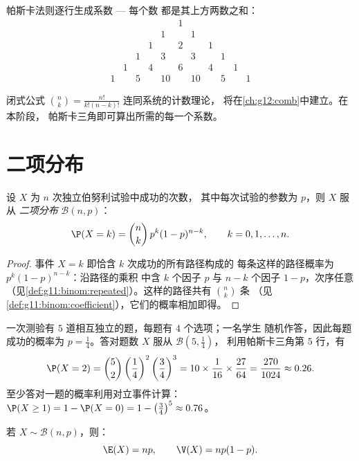 帕斯卡法则逐行生成系数 --- 每个数
都是其上方两数之和：
\[
\begin{array}{ccccccccccc}
&&&&&1&&&&&\\
&&&&1&&1&&&&\\
&&&1&&2&&1&&&\\
&&1&&3&&3&&1&&\\
&1&&4&&6&&4&&1&\\
1&&5&&10&&10&&5&&1
\end{array}
\]

\begin{remark}
闭式公式 $\binom nk = \frac{n!}{k!(n-k)!}$ 连同系统的计数理论，
将在\cref{ch:g12:comb}中建立。在本阶段，
帕斯卡三角即可算出所需的每一个系数。
\end{remark}

\section{二项分布}

\begin{theorem}[二项分布]\label{thm:g11:binom:binomial}
设 $X$ 为 $n$ 次独立伯努利试验中成功的次数，
其中每次试验的参数为 $p$，则 $X$ 服从
\emph{二项分布} $\mathcal B(n, p)$：
\[
\P(X = k) = \binom{n}{k}\, p^k (1-p)^{n-k},
\qquad k = 0, 1, \dots, n .
\]
\end{theorem}

\begin{proof}
事件 $X = k$ 即恰含 $k$ 次成功的所有路径构成的
每条这样的路径概率为 $p^k(1-p)^{n-k}$：沿路径的乘积
中含 $k$ 个因子 $p$ 与 $n - k$ 个因子 $1-p$，次序任意
（见\cref{def:g11:binom:repeated}）。这样的路径共有 $\binom nk$ 条
（见\cref{def:g11:binom:coefficient}），它们的概率相加即得。
\end{proof}

\begin{example}\label{ex:g11:binom:quiz}
一次测验有 $5$ 道相互独立的题，每题有 $4$ 个选项；一名学生
随机作答，因此每题成功的概率为 $p = \frac14$。答对题数
$X$ 服从 $\mathcal B\left(5, \frac14\right)$，
利用帕斯卡三角第 $5$ 行，有
\[
\P(X = 2) = \binom52 \left(\frac14\right)^2\left(\frac34\right)^3
= 10 \times \frac{1}{16} \times \frac{27}{64}
= \frac{270}{1024} \approx 0.26 .
\]
至少答对一题的概率利用对立事件计算：
$\P(X \geq 1) = 1 - \P(X = 0) = 1 - \left(\frac34\right)^5 \approx
0.76$。
\end{example}

\begin{proposition}[期望与方差]\label{prop:g11:binom:expectation}
若 $X \sim \mathcal B(n, p)$，则：
\[
\E(X) = np,
\qquad
\V(X) = np(1-p).
\]
\end{proposition}

